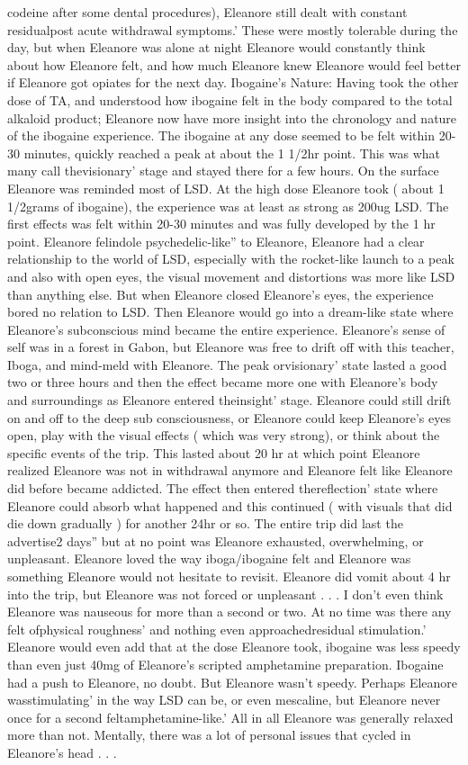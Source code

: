 \documentclass[12pt]{book}
\begin{document}
codeine after some dental procedures), Eleanore still dealt with constant residualpost acute withdrawal symptoms.' These were mostly tolerable during the day, but when Eleanore was alone at night Eleanore would constantly think about how Eleanore felt, and how much Eleanore knew Eleanore would feel better if Eleanore got opiates for the next day. Ibogaine's Nature: Having took the other dose of TA, and understood how ibogaine felt in the body compared to the total alkaloid product; Eleanore now have more insight into the chronology and nature of the ibogaine experience. The ibogaine at any dose seemed to be felt within 20-30 minutes, quickly reached a peak at about the 1 1/2hr point. This was what many call thevisionary' stage and stayed there for a few hours. On the surface Eleanore was reminded most of LSD. At the high dose Eleanore took ( about 1 1/2grams of ibogaine), the experience was at least as strong as 200ug LSD. The first effects was felt within 20-30 minutes and was fully developed by the 1  hr point. Eleanore felindole psychedelic-like'' to Eleanore, Eleanore had a clear relationship to the world of LSD, especially with the rocket-like launch to a peak and also with open eyes, the visual movement and distortions was more like LSD than anything else. But when Eleanore closed Eleanore's eyes, the experience bored no relation to LSD. Then Eleanore would go into a dream-like state where Eleanore's subconscious mind became the entire experience. Eleanore's sense of self was in a forest in Gabon, but Eleanore was free to drift off with this teacher, Iboga, and mind-meld with Eleanore. The peak orvisionary' state lasted a good two or three hours and then the effect became more one with Eleanore's body and surroundings as Eleanore entered theinsight' stage. Eleanore could still drift on and off to the deep sub consciousness, or Eleanore could keep Eleanore's eyes open, play with the visual effects ( which was very strong), or think about the specific events of the trip. This lasted about 20 hr at which point Eleanore realized Eleanore was not in withdrawal anymore and Eleanore felt like Eleanore did before became addicted. The effect then entered thereflection' state where Eleanore could absorb what happened and this continued ( with visuals that did die down gradually ) for another 24hr or so. The entire trip did last the advertise2 days'' but at no point was Eleanore exhausted, overwhelming, or unpleasant. Eleanore loved the way iboga/ibogaine felt and Eleanore was something Eleanore would not hesitate to revisit. Eleanore did vomit about 4 hr into the trip, but Eleanore was not forced or unpleasant . . . I don't even think Eleanore was nauseous for more than a second or two. At no time was there any felt ofphysical roughness' and nothing even approachedresidual stimulation.' Eleanore would even add that at the dose Eleanore took, ibogaine was less speedy than even just 40mg of Eleanore's scripted amphetamine preparation. Ibogaine had a push to Eleanore, no doubt. But Eleanore wasn't speedy. Perhaps Eleanore wasstimulating' in the way LSD can be, or even mescaline, but Eleanore never once for a second feltamphetamine-like.' All in all Eleanore was generally relaxed more than not. Mentally, there was a lot of personal issues that cycled in Eleanore's head . . .  
\end{document}
